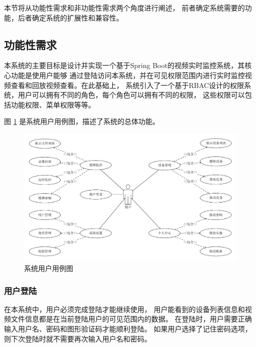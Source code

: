 
本节将从功能性需求和非功能性需求两个角度进行阐述\cite{刘意凡0基于}，
前者确定系统需要的功能，后者确定系统的扩展性和兼容性。

\subsection{功能性需求}
本系统的主要目标是设计并实现一个基于Spring Boot的视频实时监控系统，其核心功能是使用户能够
通过登陆访问本系统，并在可见权限范围内进行实时监控视频查看和回放视频查看。在此基础上，
系统引入了一个基于RBAC设计的权限系统，用户可以拥有不同的角色，每个角色可以拥有不同的权限，
这些权限可以包括功能权限、菜单权限等等。

图 \ref{Fig:case} 是系统用户用例图，描述了系统的总体功能。
\begin{figure}[ht]
    \centering   
    \includegraphics[width=1\linewidth]{./Figure/IMG_case.pdf}
    \caption{系统用户用例图}\label{Fig:case}
\end{figure}

\subsubsection{用户登陆}
在本系统中，用户必须完成登陆才能继续使用，
用户能看到的设备列表信息和视频文件信息都是在当前登陆用户的可见范围内的数据。
在登陆时，用户需要正确输入用户名、密码和图形验证码才能顺利登陆。
如果用户选择了记住密码选项，则下次登陆时就不需要再次输入用户名和密码。

